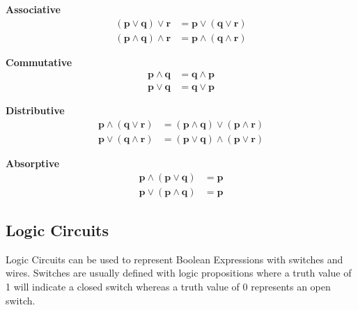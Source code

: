 \begin{law}\label{mod1:law:Associative}
   \textbf{Associative}
   \begin{align}
      \boldsymbol{(p \lor q) \lor r} &= \boldsymbol{p \lor (q \lor r)} \\
      \boldsymbol{(p \land q) \land r} &= \boldsymbol{p \land (q \land r)}
   \end{align}
\end{law}

 \begin{law}\label{mod1:law:Commutative}
   \textbf{Commutative}
   \begin{align}
      \boldsymbol{p \land q} &= \boldsymbol{q \land p} \\
      \boldsymbol{p \lor q} &= \boldsymbol{q \lor p}
   \end{align}
\end{law}

\begin{law}\label{mod1:law:Distributive}
   \textbf{Distributive}
   \begin{align}
      \boldsymbol{p \land (q \lor r)} &= \boldsymbol{(p \land q) \lor (p \land r)} \\
      \boldsymbol{p \lor (q \land r)} &= \boldsymbol{(p \lor q) \land (p \lor r) }
   \end{align}
\end{law}

\begin{law}\label{mod1:law:Absorptive}
   \textbf{Absorptive}
   \begin{align}
      \boldsymbol{p \land (p \lor q)} &= \boldsymbol{p}\\
      \boldsymbol{p \lor (p \land q)} &= \boldsymbol{p}
   \end{align}
\end{law}


\subsection{Logic Circuits}\label{mod1:section:LogicCircuits}

\begin{defn}
	Logic Circuits can be used to represent Boolean Expressions with switches and wires. Switches are usually defined with logic propositions where a truth value of 1 will indicate a closed switch whereas a truth value of 0 represents an open switch.
\end{defn}

